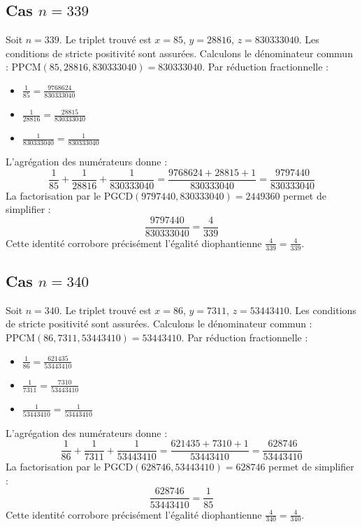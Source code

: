 \documentclass[11pt,a4paper]{article}
\begin{document}
\subsection{Cas $n = 339$}
Soit $n = 339$. Le triplet trouvé est $x = 85$, $y = 28816$, $z = 830333040$.
Les conditions de stricte positivité sont assurées.
Calculons le dénominateur commun : $\text{PPCM}(85, 28816, 830333040) = 830333040$.
Par réduction fractionnelle :
\begin{itemize}
    \item $\frac{1}{85} = \frac{9768624}{830333040}$
    \item $\frac{1}{28816} = \frac{28815}{830333040}$
    \item $\frac{1}{830333040} = \frac{1}{830333040}$
\end{itemize}
L'agrégation des numérateurs donne :
$$ \frac{1}{85} + \frac{1}{28816} + \frac{1}{830333040} = \frac{9768624 + 28815 + 1}{830333040} = \frac{9797440}{830333040} $$
La factorisation par le $\text{PGCD}(9797440, 830333040) = 2449360$ permet de simplifier :
$$ \frac{9797440}{830333040} = \frac{4}{339} $$
Cette identité corrobore précisément l'égalité diophantienne $\frac{4}{339} = \frac{4}{339}$.

\subsection{Cas $n = 340$}
Soit $n = 340$. Le triplet trouvé est $x = 86$, $y = 7311$, $z = 53443410$.
Les conditions de stricte positivité sont assurées.
Calculons le dénominateur commun : $\text{PPCM}(86, 7311, 53443410) = 53443410$.
Par réduction fractionnelle :
\begin{itemize}
    \item $\frac{1}{86} = \frac{621435}{53443410}$
    \item $\frac{1}{7311} = \frac{7310}{53443410}$
    \item $\frac{1}{53443410} = \frac{1}{53443410}$
\end{itemize}
L'agrégation des numérateurs donne :
$$ \frac{1}{86} + \frac{1}{7311} + \frac{1}{53443410} = \frac{621435 + 7310 + 1}{53443410} = \frac{628746}{53443410} $$
La factorisation par le $\text{PGCD}(628746, 53443410) = 628746$ permet de simplifier :
$$ \frac{628746}{53443410} = \frac{1}{85} $$
Cette identité corrobore précisément l'égalité diophantienne $\frac{4}{340} = \frac{4}{340}$.
\end{document}
